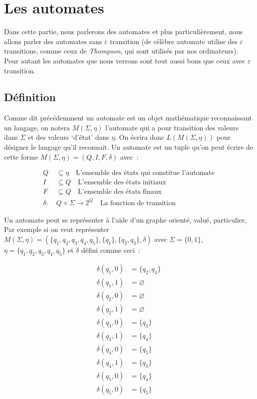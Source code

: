 \section{Les automates}

Dans cette partie, nous parlerons des automates et plus particulièrement, nous
allons parler des automates sans \(\varepsilon\) transition (de célèbre
automate utilise des \(\varepsilon\) transitions, comme ceux de
\textit{Thompson}, qui sont utilisés par nos ordinateurs). Pour autant les
automates que nous verrons sont tout aussi bons que ceux avec \(\varepsilon\)
transition.

\subsection{Définition}

Comme dit précédemment un automate est un objet mathématique reconnaissant un
langage, on notera \(M(\Sigma, \eta)\) l'automate qui a pour transition des
valeurs dans \(\Sigma\) et des valeurs `d'état' dans \(\eta\). On écrira donc
\(L(M(\Sigma, \eta))\) pour désigner le langage qu'il reconnait. Un automate
est un tuple qu'on peut écrire de cette forme \(M(\Sigma, \eta) = (Q, I, F,
\delta)\) avec~:

\begin{align}
    Q        & \subseteq \eta \quad \text{L'ensemble des états qui constitue l'automate} \\
    I        & \subseteq Q \quad \text{L'ensemble des états initiaux}                    \\
    F        & \subseteq Q \quad \text{L'ensemble des états finaux}                      \\
    \delta:~ & Q \times \Sigma \to 2^Q \quad \text{La fonction de transition}
\end{align}

Un automate peut se représenter à l'aide d'un graphe orienté, valué,
particulier, Par exemple si on veut représenter \(M(\Sigma, \eta) = (\{q_1,
q_2, q_3, q_4, q_5\}, \{q_1\},\{q_2, q_3\}, \delta)\) avec \(\Sigma = \{0,
1\}\), \(\eta = \{q_1, q_2, q_3, q_4, q_5\}\) et \(\delta\) défini comme ceci~:

\begin{align*}
    \delta(q_1, 0) & = \{q_2, q_4\} \\
    \delta(q_1, 1) & = \varnothing  \\
    \delta(q_2, 0) & = \varnothing  \\
    \delta(q_2, 1) & = \varnothing  \\
    \delta(q_3, 0) & = \{q_3\}      \\
    \delta(q_3, 1) & = \{q_4\}      \\
    \delta(q_4, 0) & = \{q_5\}      \\
    \delta(q_4, 1) & = \{q_3\}      \\
    \delta(q_5, 0) & = \{q_4\}      \\
    \delta(q_5, 0) & = \{q_5\}      \\
\end{align*}

